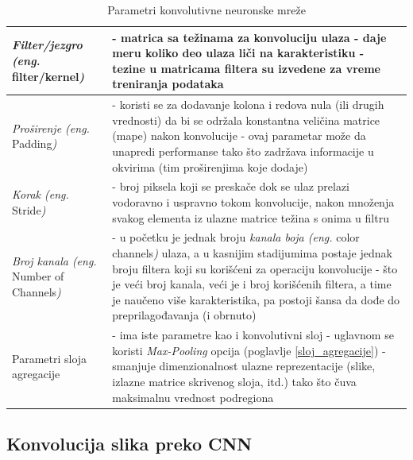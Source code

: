 \documentclass[a4paper]{article}
\begin{document}
\begin{table}[h!]
\begin{center}
\caption{Parametri konvolutivne neuronske mreže}
\begin{tabular}{|l|p{60mm}|}
\hline
\textit{Filter/jezgro (eng.} filter/kernel\textit{)} &
- matrica sa težinama za konvoluciju ulaza \newline
- daje meru koliko deo ulaza liči na karakteristiku \newline
- tezine u matricama filtera su izvedene za vreme treniranja podataka
\\
\hline
\textit{Proširenje (eng.} Padding\textit{)} &
- koristi se za dodavanje kolona i redova nula (ili drugih vrednosti) da bi se održala konstantna veličina matrice (mape) nakon konvolucije \newline
- ovaj parametar može da unapredi performanse tako što zadržava informacije u okvirima (tim proširenjima koje dodaje)
\\
\hline 
\textit{Korak (eng.} Stride\textit{)} &
- broj piksela koji se preskače dok se ulaz prelazi vodoravno i uspravno tokom konvolucije, nakon množenja svakog elementa iz ulazne matrice težina s onima u filtru
\\
\hline 
\textit{Broj kanala (eng.} Number of Channels\textit{)} &
- u početku je jednak broju \textit{kanala boja (eng.} color channels\textit{)} ulaza, a u kasnijim stadijumima postaje jednak broju filtera koji su korišćeni za operaciju konvolucije \newline
- što je veći broj kanala, veći je i broj korišćenih filtera, a time je naučeno više karakteristika, pa postoji šansa da dođe do preprilagođavanja (i obrnuto)
\\
\hline 
Parametri sloja agregacije &
- ima iste parametre kao i konvolutivni sloj \newline
- uglavnom se koristi \textit{Max-Pooling} opcija (poglavlje \ref{sloj_agregacije}) \newline
- smanjuje dimenzionalnost ulazne reprezentacije (slike, izlazne matrice skrivenog sloja, itd.) tako što čuva maksimalnu vrednost podregiona
\\
\hline 
\end{tabular}
\label{tabela_parametri}
\end{center}
\end{table}


\subsection{Konvolucija slika preko CNN}
\end{document}
